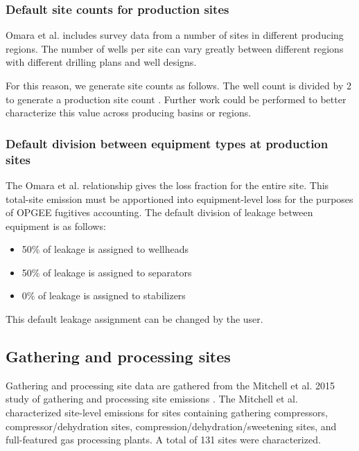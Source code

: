 \documentclass[11pt]{report}
\begin{document}
{{{{\subsubsection{Default site counts for production sites}

Omara et al. includes survey data from a number of sites in different producing regions. The number of wells per site can vary greatly between different regions with different drilling plans and well designs. 

For this reason, we generate site counts as follows. The well count is divided by 2 to generate a production site count \cite{Englander2018}. Further work could be performed to better characterize this value across producing basins or regions.

\subsubsection{Default division between equipment types at production sites}

The Omara et al. relationship gives the loss fraction for the entire site. This total-site emission must be apportioned into equipment-level loss for the purposes of OPGEE fugitives accounting. The default division of leakage between equipment is as follows:
\begin{itemize}
\item 50\% of leakage is assigned to wellheads
\item 50\% of leakage is assigned to separators
\item 0\% of leakage is assigned to stabilizers 
\end{itemize}
This default leakage assignment can be changed by the user.

\subsection{Gathering and processing sites}

Gathering and processing site data are gathered from the Mitchell et al. 2015 study of gathering and processing site emissions \cite{Mitchell2015}. The Mitchell et al. characterized site-level emissions for sites containing gathering compressors, compressor/dehydration sites, compression/dehydration/sweetening sites, and full-featured gas processing plants. A total of 131 sites were characterized.  

}}}}
\end{document}
